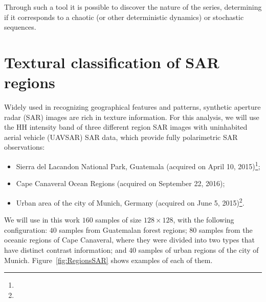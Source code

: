 \documentclass[paper=letter, fontsize=12pt]{article}
\begin{document}
	Through such a tool it is possible to discover the nature of the series, determining if it corresponds to a chaotic (or other deterministic dynamics) or stochastic sequences.
	
	\section{Textural classification of SAR regions}\label{SAR}
	
	Widely used in recognizing geographical features and patterns, synthetic aperture radar (SAR) images are rich in texture information.
	For this analysis, we will use the HH intensity band of three different region SAR images with uninhabited aerial vehicle (UAVSAR) SAR data, which provide fully polarimetric SAR observations:
	
	\begin{itemize}
		\item Sierra del Lacandon National Park, Guatemala (acquired on April 10, 2015)\footnote{};
		\item Cape Canaveral Ocean Regions (acquired on September 22, 2016);
		\item Urban area of the city of Munich, Germany (acquired on June 5, 2015)\footnote{}.
	\end{itemize}
	We will use in this work $160$ samples of size $128 \times 128$, with the following configuration:
	$40$ samples from Guatemalan forest regions;
	$80$ samples from the oceanic regions of Cape Canaveral, where they were divided into two types that have distinct contrast information; and
	$40$ samples of urban regions of the city of Munich.
	Figure~\ref{fig:RegionsSAR} shows examples of each of them.
	
\end{document}
